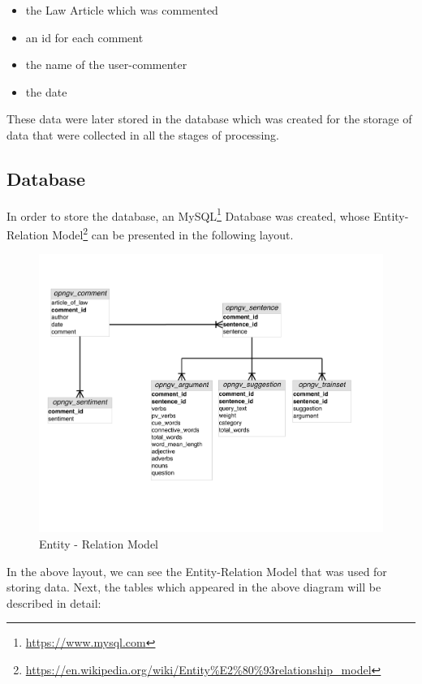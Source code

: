 \begin{itemize}

	\item the Law Article which was commented
	\item an id for each comment
	\item the name of the user-commenter
	\item the date\\

\end{itemize}

These data were later stored in the database which was created for the storage of data that were collected in all the stages of processing.

\subsection{Database}\label{314_ref}
In order to store the database, an MySQL\footnote{\url{https://www.mysql.com}} Database was created, whose Entity-Relation Model\footnote{\url{https://en.wikipedia.org/wiki/Entity\%E2\%80\%93relationship_model}} can be presented in the following layout.
\newpage
\begin{figure}[H]
\centering
\includegraphics[width=1.15\linewidth]{figure/ER.pdf}
\caption{Entity - Relation Model}
\end{figure}

In the above layout, we can see the Entity-Relation Model that was used for storing data. Next, the tables  which appeared in the above diagram will be described in detail:\\

